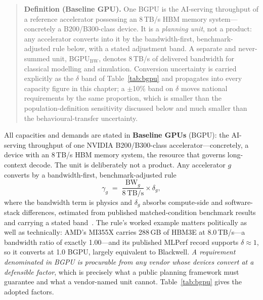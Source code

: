 \begin{quote}\small
\textbf{Definition (Baseline GPU).} One BGPU is the AI-serving throughput of a reference accelerator possessing an 8\,TB/s HBM memory system---concretely a B200/B300-class device. It is a \emph{planning unit}, not a product: any accelerator converts into it by the bandwidth-first, benchmark-adjusted rule below, with a stated adjustment band. A separate and never-summed unit, BGPU$_{\mathrm{BW}}$, denotes 8\,TB/s of delivered bandwidth for classical modelling and simulation. Conversion uncertainty is carried explicitly as the $\delta$ band of Table~\ref{tab:bgpu} and propagates into every capacity figure in this chapter; a $\pm$10\% band on $\delta$ moves national requirements by the same proportion, which is smaller than the population-definition sensitivity discussed below and much smaller than the behavioural-transfer uncertainty.
\end{quote}

All capacities and demands are stated in \textbf{Baseline GPUs} (BGPU): the AI-serving throughput of one NVIDIA B200/B300-class accelerator---concretely, a device with an 8\,TB/s HBM memory system, the resource that governs long-context decode. The unit is deliberately not a product. Any accelerator $g$ converts by a bandwidth-first, benchmark-adjusted rule
\[
\gamma_g \;=\; \frac{\mathrm{BW}_g}{8\ \mathrm{TB/s}} \times \delta_g ,
\]
where the bandwidth term is physics and $\delta_g$ absorbs compute-side and software-stack differences, estimated from published matched-condition benchmark results and carrying a stated band~\cite{ai4s-framework}. The rule's worked example matters politically as well as technically: AMD's MI355X carries 288\,GB of HBM3E at 8.0\,TB/s---a bandwidth ratio of exactly 1.00---and its published MLPerf record supports $\delta\approx1$, so it converts at 1.0 BGPU, largely equivalent to Blackwell. \emph{A requirement denominated in BGPU is procurable from any vendor whose devices convert at a defensible factor}, which is precisely what a public planning framework must guarantee and what a vendor-named unit cannot. Table~\ref{tab:bgpu} gives the adopted factors.

